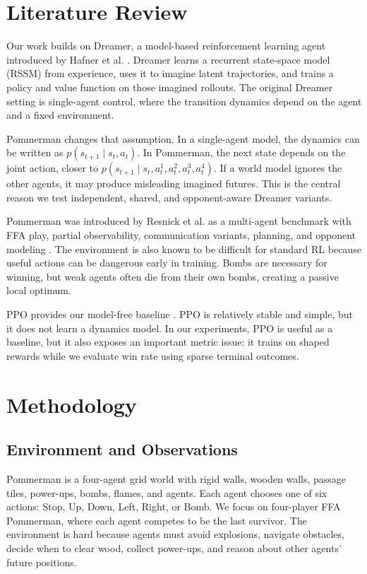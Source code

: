 \documentclass[11pt]{article}
\begin{document}
\section{Literature Review}

Our work builds on Dreamer, a model-based reinforcement learning agent introduced by Hafner et al. \cite{hafner2020dreamer}. Dreamer learns a recurrent state-space model (RSSM) from experience, uses it to imagine latent trajectories, and trains a policy and value function on those imagined rollouts. The original Dreamer setting is single-agent control, where the transition dynamics depend on the agent and a fixed environment.

Pommerman changes that assumption. In a single-agent model, the dynamics can be written as $p(s_{t+1} \mid s_t, a_t)$. In Pommerman, the next state depends on the joint action, closer to $p(s_{t+1} \mid s_t, a_t^1, a_t^2, a_t^3, a_t^4)$. If a world model ignores the other agents, it may produce misleading imagined futures. This is the central reason we test independent, shared, and opponent-aware Dreamer variants.

Pommerman was introduced by Resnick et al. as a multi-agent benchmark with FFA play, partial observability, communication variants, planning, and opponent modeling \cite{resnick2018pommerman}. The environment is also known to be difficult for standard RL because useful actions can be dangerous early in training. Bombs are necessary for winning, but weak agents often die from their own bombs, creating a passive local optimum.

PPO provides our model-free baseline \cite{schulman2017ppo}. PPO is relatively stable and simple, but it does not learn a dynamics model. In our experiments, PPO is useful as a baseline, but it also exposes an important metric issue: it trains on shaped rewards while we evaluate win rate using sparse terminal outcomes.

\section{Methodology}

\subsection{Environment and Observations}

Pommerman is a four-agent grid world with rigid walls, wooden walls, passage tiles, power-ups, bombs, flames, and agents. Each agent chooses one of six actions: Stop, Up, Down, Left, Right, or Bomb. We focus on four-player FFA Pommerman, where each agent competes to be the last survivor. The environment is hard because agents must avoid explosions, navigate obstacles, decide when to clear wood, collect power-ups, and reason about other agents' future positions.
\end{document}
